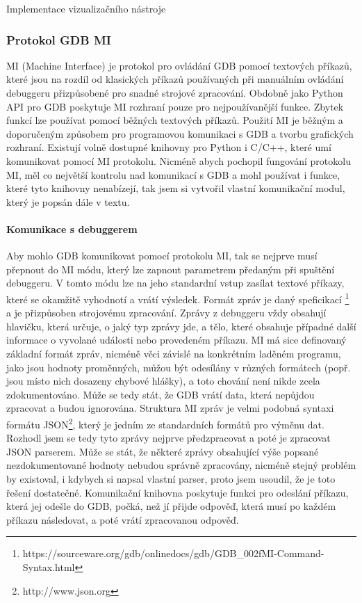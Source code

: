 \documentclass[czech,bachelor,male,python,dept460]{diploma}						%
\begin{document}
\begin{section}{Implementace vizualizačního nástroje}
		\subsubsection{Protokol GDB MI}
		MI (Machine Interface) je protokol pro ovládání GDB pomocí textových příkazů, které jsou na rozdíl od klasických příkazů používaných při manuálním
		ovládání debuggeru přizpůsobené pro snadné strojové zpracování. Obdobně jako Python API pro GDB poskytuje MI rozhraní pouze pro nejpoužívanější funkce.
		Zbytek funkcí lze používat pomocí běžných textových příkazů. Použití MI je běžným a doporučeným \cite{gdb-mi-usage} způsobem pro programovou komunikaci
		s GDB a tvorbu grafických rozhraní. Existují volně dostupné knihovny pro Python i C/C++, které umí komunikovat pomocí MI protokolu.
		Nicméně abych pochopil fungování protokolu MI, měl co největší kontrolu nad komunikací s GDB a mohl používat i funkce, které tyto knihovny nenabízejí, tak
		jsem si vytvořil vlastní komunikační modul, který je popsán dále v textu.
		
		\paragraph*{Komunikace s debuggerem}
			Aby mohlo GDB komunikovat pomocí protokolu MI, tak se nejprve musí přepnout do MI módu, který lze zapnout parametrem předaným při spuštění debuggeru.
			V tomto módu lze na jeho standardní vstup zasílat textové příkazy, které se okamžitě vyhodnotí a vrátí výsledek. Formát zpráv je daný speficikací
			\footnote{https://sourceware.org/gdb/onlinedocs/gdb/GDB\_002fMI-Command-Syntax.html} a je přizpůsoben strojovému zpracování. Zprávy z debuggeru
			vždy obsahují hlavičku, která určuje, o jaký typ zprávy jde, a tělo, které obsahuje případné další informace o vyvolané události nebo
			provedeném příkazu. MI má sice definovaný základní formát zpráv, nicméně věci závislé na konkrétním laděném programu, jako jsou hodnoty proměnných,
			můžou být odesílány v různých formátech (popř. jsou místo nich dosazeny chybové hlášky), a toto chování není nikde zcela zdokumentováno.
			Může se tedy stát, že GDB vrátí data, která nepůjdou zpracovat a budou ignorována. Struktura MI zpráv je velmi podobná syntaxi formátu
			JSON\footnote{http://www.json.org}, který je jedním ze standardních formátů pro výměnu dat. Rozhodl jsem se tedy
			tyto zprávy nejprve předzpracovat a poté je zpracovat JSON parserem. Může se stát, že některé zprávy obsahující výše popsané nezdokumentované
			hodnoty nebudou správně zpracovány, nicméně stejný problém by existoval, i kdybych si napsal vlastní parser, proto jsem usoudil, že je toto řešení
			dostatečné. Komunikační knihovna poskytuje funkci pro odeslání příkazu, která jej odešle do GDB, počká, než jí přijde odpověď, která musí po
			každém příkazu následovat, a poté vrátí zpracovanou odpověď.
			

\end{section}
\end{document}
